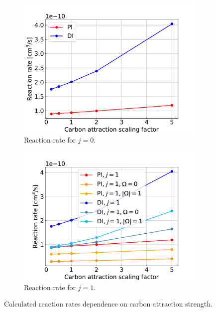 \documentclass{article}
\begin{document}
    \begin{figure}[H]
        \centering
        \begin{subfigure}{.4\linewidth}
            \centering
            \includegraphics[width=\linewidth]{attr_c_scaling_0.pdf}
            \caption{Reaction rate for $j = 0$.}
        \end{subfigure}
        \begin{subfigure}{.4\linewidth}
            \centering
            \includegraphics[width=\linewidth]{attr_c_scaling_1.pdf}
            \caption{Reaction rate for $j = 1$.}
        \end{subfigure}     
        \caption{Calculated reaction rates dependence on carbon attraction strength.}
    \end{figure}
\end{document}
